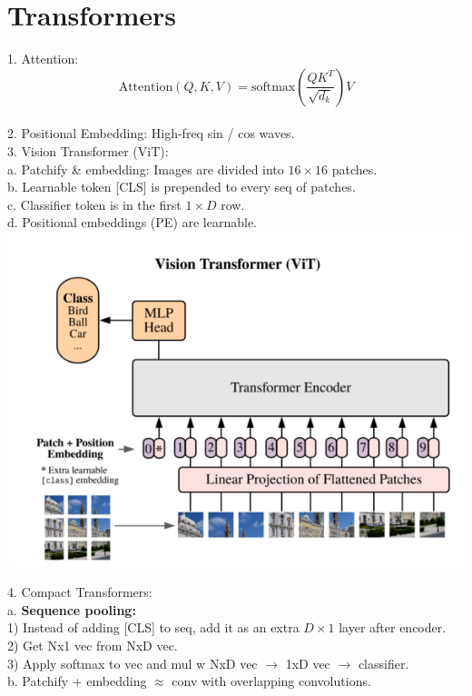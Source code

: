 \section{Transformers}


1. Attention:  
   \[
   \text{Attention}(Q, K, V) = \text{softmax}\left(\frac{QK^T}{\sqrt{d_k}}\right) V
   \] \\
2. Positional Embedding: High-freq sin / cos waves. \\

3. Vision Transformer (ViT): \\
   a. Patchify \& embedding: Images are divided into $16 \times 16$ patches. \\ 
   b. Learnable token [CLS] is prepended to every seq of patches. \\
   c. Classifier token is in the first $1 \times D$ row. \\
   d. Positional embeddings (PE) are learnable. \\
\includegraphics[width=1.0\linewidth]{images/vit.png}

4. Compact Transformers: \\
   a. \textbf{Sequence pooling:} \\
   1) Instead of adding [CLS] to seq, add it as an extra $D \times 1$ layer after encoder. \\
   2) Get Nx1 vec from NxD vec. \\
   3) Apply softmax to vec and mul w NxD vec $\to$ 1xD vec $\to$ classifier. \\
   b. Patchify + embedding $\approx$ conv with overlapping convolutions. \\

